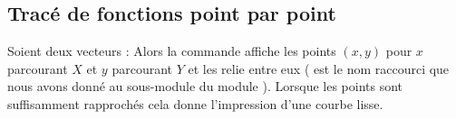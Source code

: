 \documentclass[11pt,class=report,crop=false]{standalone}
\begin{document}
\subsection{Tracé de fonctions point par point}

Soient deux vecteurs :
Alors la commande  affiche les points $(x,y)$ pour $x$ parcourant $X$ et $y$ parcourant $Y$ et les relie entre eux ( est le nom raccourci que nous avons donné au sous-module  du module \matplotlib{}). Lorsque les points sont suffisamment rapprochés cela donne l'impression d'une courbe lisse.

\end{document}
